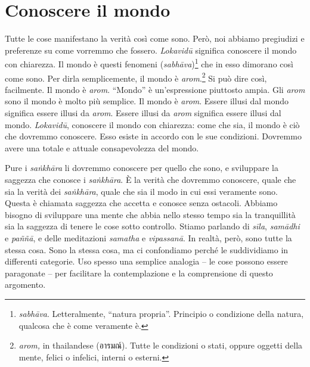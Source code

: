 \chapter{Conoscere il mondo}

Tutte le cose manifestano la verità così come sono. Però, noi abbiamo
pregiudizi e preferenze su come vorremmo che fossero. \emph{Lokavidū}
significa conoscere il mondo con chiarezza. Il mondo è questi fenomeni
(\emph{sabhāva})\footnote{\emph{sabhāva}. Letteralmente, ``natura
  propria''. Principio o condizione della natura, qualcosa che è come
  veramente è.} che in esso dimorano così come sono. Per dirla
semplicemente, il mondo è \emph{arom}.\footnote{\emph{arom,} in
  thailandese (อารมณ์). Tutte le condizioni o stati, oppure oggetti
  della mente, felici o infelici, interni o esterni.} Si può dire così,
facilmente. Il mondo è \emph{arom}. ``Mondo'' è un'espressione piuttosto
ampia. Gli \emph{arom} sono il mondo è molto più semplice. Il mondo è
\emph{arom}. Essere illusi dal mondo significa essere illusi da
\emph{arom}. Essere illusi da \emph{arom} significa essere illusi dal
mondo. \emph{Lokavidū}, conoscere il mondo con chiarezza: come che sia,
il mondo è ciò che dovremmo conoscere. Esso esiste in accordo con le sue
condizioni. Dovremmo avere una totale e attuale consapevolezza del
mondo.

Pure i \emph{saṅkhāra} li dovremmo conoscere per quello che sono, e
sviluppare la saggezza che conosce i \emph{saṅkhāra}. È la verità che
dovremmo conoscere, quale che sia la verità dei \emph{saṅkhāra}, quale
che sia il modo in cui essi veramente sono. Questa è chiamata saggezza
che accetta e conosce senza ostacoli. Abbiamo bisogno di sviluppare una
mente che abbia nello stesso tempo sia la tranquillità sia la saggezza
di tenere le cose sotto controllo. Stiamo parlando di \emph{sīla},
\emph{samādhi} e \emph{paññā}, e delle meditazioni \emph{samatha} e
\emph{vipassanā}. In realtà, però, sono tutte la stessa cosa. Sono la
stessa cosa, ma ci confondiamo perché le suddividiamo in differenti
categorie. Uso spesso una semplice analogia -- le cose possono essere
paragonate -- per facilitare la contemplazione e la comprensione di
questo argomento.

